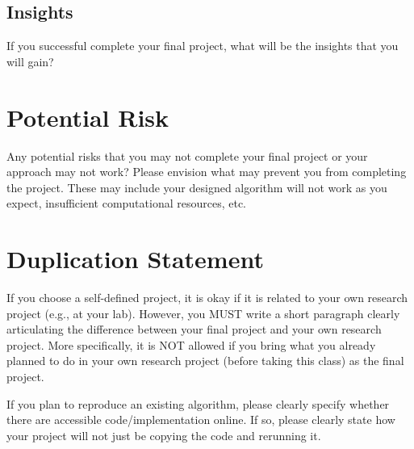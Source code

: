 \documentclass{article}
\begin{document}
\subsection{Insights}
{\color{red}
If you successful complete your final project, what will be the insights that you will gain?
}

\section{Potential Risk}
{\color{red}
Any potential risks that you may not complete your final project or your approach may not work? Please envision what may prevent you from completing the project. These may include your designed algorithm will not work as you expect, insufficient computational resources, etc. 
}

\section{Duplication Statement}
{\color{red}
If you choose a self-defined project, it is okay if it is related to your own research project (e.g., at your lab). However, you MUST write a short paragraph clearly articulating the difference between your final project and your own research project. More specifically, it is NOT allowed if you bring what you already planned to do in your own research project (before taking this class) as the final project.

If you plan to reproduce an existing algorithm, please clearly specify whether there are accessible code/implementation online. If so, please clearly state how your project will not just be copying the code and rerunning it.
}





\end{document}

